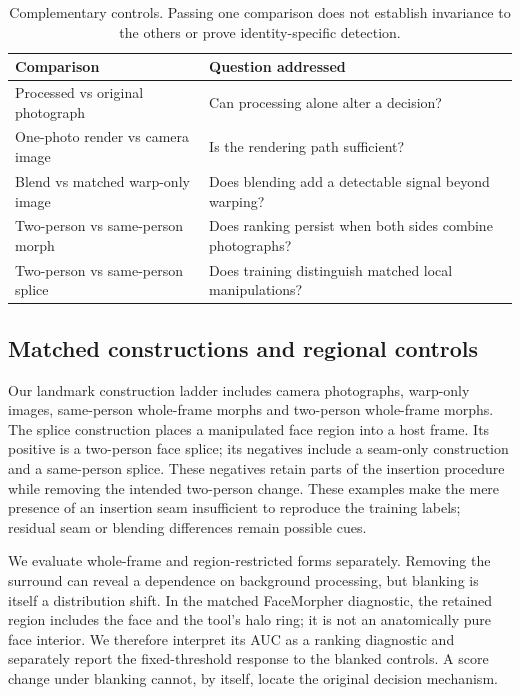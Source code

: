 \begin{table}[t]
\centering
\small
\setlength{\tabcolsep}{3pt}
\begin{tabular}{p{.43\linewidth}p{.49\linewidth}}
\toprule
Comparison & Question addressed \\
\midrule
Processed vs original photograph & Can processing alone alter a decision? \\
One-photo render vs camera image & Is the rendering path sufficient? \\
Blend vs matched warp-only image & Does blending add a detectable signal beyond warping? \\
Two-person vs same-person morph & Does ranking persist when both sides combine photographs? \\
Two-person vs same-person splice & Does training distinguish matched local manipulations? \\
\bottomrule
\end{tabular}
\caption{Complementary controls. Passing one comparison does not establish invariance to the others or prove identity-specific detection.}
\label{tab:control-design}
\end{table}

\subsection{Matched constructions and regional controls}
Our landmark construction ladder includes camera photographs, warp-only images, same-person whole-frame morphs and two-person whole-frame morphs. The splice construction places a manipulated face region into a host frame. Its positive is a two-person face splice; its negatives include a seam-only construction and a same-person splice. These negatives retain parts of the insertion procedure while removing the intended two-person change. These examples make the mere presence of an insertion seam insufficient to reproduce the training labels; residual seam or blending differences remain possible cues.

We evaluate whole-frame and region-restricted forms separately. Removing the surround can reveal a dependence on background processing, but blanking is itself a distribution shift. In the matched FaceMorpher diagnostic, the retained region includes the face and the tool's halo ring; it is not an anatomically pure face interior. We therefore interpret its AUC as a ranking diagnostic and separately report the fixed-threshold response to the blanked controls. A score change under blanking cannot, by itself, locate the original decision mechanism.

